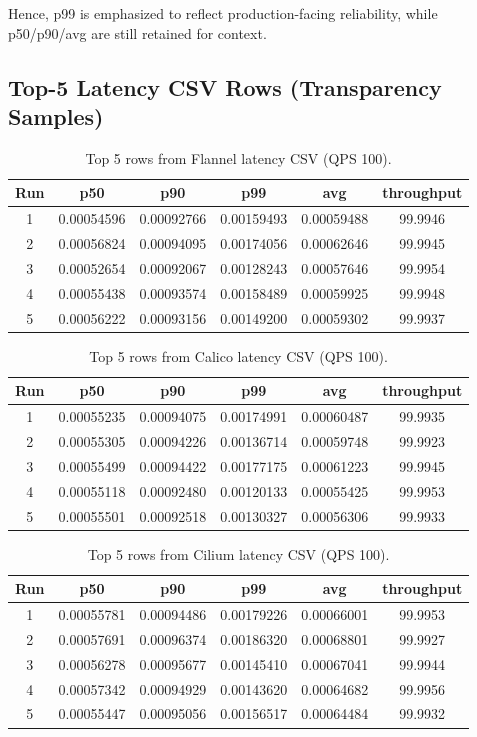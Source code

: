 \documentclass[12pt,a4paper]{article}
\begin{document}
Hence, p99 is emphasized to reflect production-facing reliability, while p50/p90/avg are still retained for context.

\subsection{Top-5 Latency CSV Rows (Transparency Samples)}
\begin{table}[H]
\centering
\small
\caption{Top 5 rows from Flannel latency CSV (QPS 100).}
\begin{tabular}{cccccc}
\toprule
Run & p50 & p90 & p99 & avg & throughput \\
\midrule
1 & 0.00054596 & 0.00092766 & 0.00159493 & 0.00059488 & 99.9946 \\
2 & 0.00056824 & 0.00094095 & 0.00174056 & 0.00062646 & 99.9945 \\
3 & 0.00052654 & 0.00092067 & 0.00128243 & 0.00057646 & 99.9954 \\
4 & 0.00055438 & 0.00093574 & 0.00158489 & 0.00059925 & 99.9948 \\
5 & 0.00056222 & 0.00093156 & 0.00149200 & 0.00059302 & 99.9937 \\
\bottomrule
\end{tabular}
\end{table}

\begin{table}[H]
\centering
\small
\caption{Top 5 rows from Calico latency CSV (QPS 100).}
\begin{tabular}{cccccc}
\toprule
Run & p50 & p90 & p99 & avg & throughput \\
\midrule
1 & 0.00055235 & 0.00094075 & 0.00174991 & 0.00060487 & 99.9935 \\
2 & 0.00055305 & 0.00094226 & 0.00136714 & 0.00059748 & 99.9923 \\
3 & 0.00055499 & 0.00094422 & 0.00177175 & 0.00061223 & 99.9945 \\
4 & 0.00055118 & 0.00092480 & 0.00120133 & 0.00055425 & 99.9953 \\
5 & 0.00055501 & 0.00092518 & 0.00130327 & 0.00056306 & 99.9933 \\
\bottomrule
\end{tabular}
\end{table}

\begin{table}[H]
\centering
\small
\caption{Top 5 rows from Cilium latency CSV (QPS 100).}
\begin{tabular}{cccccc}
\toprule
Run & p50 & p90 & p99 & avg & throughput \\
\midrule
1 & 0.00055781 & 0.00094486 & 0.00179226 & 0.00066001 & 99.9953 \\
2 & 0.00057691 & 0.00096374 & 0.00186320 & 0.00068801 & 99.9927 \\
3 & 0.00056278 & 0.00095677 & 0.00145410 & 0.00067041 & 99.9944 \\
4 & 0.00057342 & 0.00094929 & 0.00143620 & 0.00064682 & 99.9956 \\
5 & 0.00055447 & 0.00095056 & 0.00156517 & 0.00064484 & 99.9932 \\
\bottomrule
\end{tabular}
\end{table}
\end{document}
